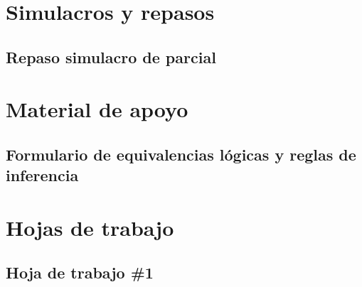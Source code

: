 \documentclass[openany]{book}
\begin{document}
\part{Simulacros y repasos}
\chapter{Repaso simulacro de parcial}



\part{Material de apoyo}
\chapter{Formulario de equivalencias lógicas y reglas de inferencia}


\part{Hojas de trabajo}
\chapter{Hoja de trabajo \#1}

\end{document}
